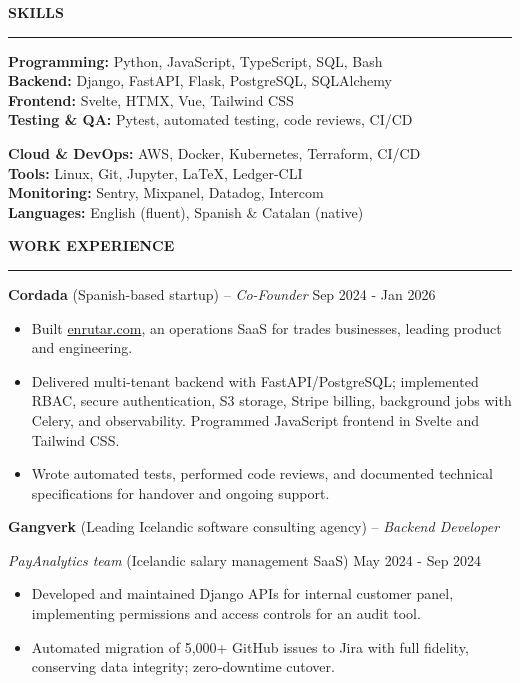 \documentclass[10pt,a4paper,ragged2e]{altacv}
\renewcommand{\cvsection}[2][]{%
  \bigskip%
  {\color{heading}\large\bfseries\MakeUppercase{#2}}\\[-1ex]%
  {\color{heading}\rule{\linewidth}{0.5pt}\par}\medskip
}
\newcommand{\cvjob}[4]{%
  \textbf{#1} {\small(#4)} -- \textit{#2} \hfill {\small #3}\par\smallskip
}
\newcommand{\cvsubentry}[3]{%
  \hspace{0.5em}\textit{#1} {\small(#2)} \hfill {\small #3}\par\smallskip
}
\begin{document}
\cvsection{Skills}
{\small
\begin{minipage}[t]{0.48\linewidth}
\textbf{Programming:} Python, JavaScript, TypeScript, SQL, Bash\\
\textbf{Backend:} Django, FastAPI, Flask, PostgreSQL, SQLAlchemy \\
\textbf{Frontend:} Svelte, HTMX, Vue, Tailwind CSS\\
\textbf{Testing \& QA:} Pytest, automated testing, code reviews, CI/CD\\
\end{minipage}%
\hfill
\begin{minipage}[t]{0.48\linewidth}
\textbf{Cloud \& DevOps:} AWS, Docker, Kubernetes, Terraform, CI/CD\\
\textbf{Tools:} Linux, Git, Jupyter, LaTeX, Ledger-CLI\\
\textbf{Monitoring:} Sentry, Mixpanel, Datadog, Intercom\\
\textbf{Languages:} English (fluent), Spanish \& Catalan (native)\\
\end{minipage}
}

\cvsection{Work Experience}

\cvjob{Cordada}{Co-Founder}{Sep 2024 - Jan 2026}{Spanish-based startup}
{\small
\begin{itemize}[nosep,topsep=0pt,parsep=0pt,partopsep=0pt,leftmargin=*]
\item Built \href{https://enrutar.com}{enrutar.com}, an operations SaaS for trades businesses, leading product and engineering.
\item Delivered multi-tenant backend with FastAPI/PostgreSQL; implemented RBAC, secure authentication, S3 storage, Stripe billing, background jobs with Celery, and observability. Programmed JavaScript frontend in Svelte and Tailwind CSS.
\item Wrote automated tests, performed code reviews, and documented technical specifications for handover and ongoing support.
\end{itemize}
}\medskip

\cvjob{Gangverk}{Backend Developer}{}{Leading Icelandic software consulting agency}

\cvsubentry{PayAnalytics team}{Icelandic salary management SaaS}{May 2024 - Sep 2024}
{\small
\begin{itemize}[nosep,topsep=0pt,parsep=0pt,partopsep=0pt,leftmargin=*]
\item Developed and maintained Django APIs for internal customer panel, implementing permissions and access controls for an audit tool.
\item Automated migration of 5,000+ GitHub issues to Jira with full fidelity, conserving data integrity; zero-downtime cutover.
\end{itemize}
}\smallskip
\end{document}
